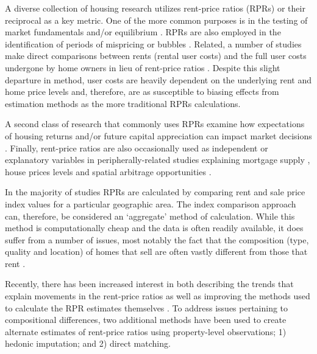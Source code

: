 \documentclass{article}\usepackage[]{graphicx}\usepackage[]{color}
\begin{document}
A diverse collection of housing research utilizes rent-price ratios (RPRs) or their reciprocal as a key metric. One of the more common purposes is in the testing of market fundamentals and/or equilibrium \citep*{capozza1996expectations, ayuso2006house, ambrose2013house, sommer2013equilibrium, hill2016}.  RPRs are also employed in the identification of periods of mispricing or bubbles \citep*{Himmelberg2005, smith2006bubble, brunnermeier2008money, pavlidis2013episodes}. Related, a number of studies make direct comparisons between rents (rental user costs) and the full user costs undergone by home owners in lieu of rent-price ratios \citep*{Himmelberg2005, verbrugge2008puzzling, feng2015bubble}. Despite this slight departure in method, user costs are heavily dependent on the underlying rent and home price levels and, therefore, are as susceptible to biasing effects from estimation methods as the more traditional RPRs calculations.\par   

A second class of research that commonly uses RPRs examine how expectations of housing returns and/or future capital appreciation can impact market decisions \citep*{hwang2006dividend, gelain2014house, hattapoglu2014dependency, engsted2015predicting}.  Finally, rent-price ratios are also occasionally used as independent or explanatory variables in peripherally-related studies explaining mortgage supply \citep{goetzmann2012subprime}, house prices levels \citep{hwang2006economic} and spatial arbitrage opportunities \citep*{glaeser2007arbitrage}.\par  

In the majority of studies RPRs are calculated by comparing rent and sale price index values for a particular geographic area. The index comparison approach can, therefore, be considered an `aggregate' method of calculation. While this method is computationally cheap and the data is often readily available, it does suffer from a number of issues, most notably the fact that the composition (type, quality and location) of homes that sell are often vastly different from those that rent \citep*{hattapoglu2014dependency, bracke2015house}.\par 

Recently, there has been increased interest in both describing the trends that explain movements in the rent-price ratios \citep*{Campbell2009} as well as improving the methods used to calculate the RPR estimates themselves \citep*{hattapoglu2014dependency, bracke2015house, hill2016}.  To address issues pertaining to compositional differences, two additional methods have been used to create alternate estimates of rent-price ratios using property-level observations; 1) hedonic imputation; and 2) direct matching.\par 
\end{document}

